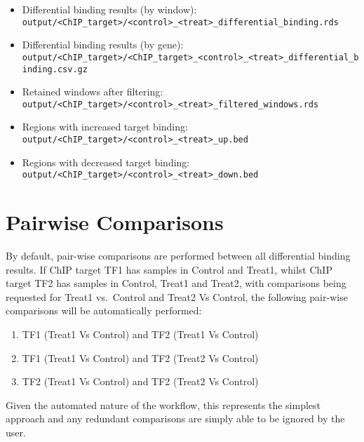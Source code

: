 \documentclass[
]{book}
\providecommand{\tightlist}{%
  \setlength{\itemsep}{0pt}\setlength{\parskip}{0pt}}
\begin{document}
\begin{itemize}
\tightlist
\item
  Differential binding results (by window): \texttt{output/\textless{}ChIP\_target\textgreater{}/\textless{}control\textgreater{}\_\textless{}treat\textgreater{}\_differential\_binding.rds}
\item
  Differential binding results (by gene): \texttt{output/\textless{}ChIP\_target\textgreater{}/\textless{}ChIP\_target\textgreater{}\_\textless{}control\textgreater{}\_\textless{}treat\textgreater{}\_differential\_binding.csv.gz}
\item
  Retained windows after filtering: \texttt{output/\textless{}ChIP\_target\textgreater{}/\textless{}control\textgreater{}\_\textless{}treat\textgreater{}\_filtered\_windows.rds}
\item
  Regions with increased target binding: \texttt{output/\textless{}ChIP\_target\textgreater{}/\textless{}control\textgreater{}\_\textless{}treat\textgreater{}\_up.bed}
\item
  Regions with decreased target binding: \texttt{output/\textless{}ChIP\_target\textgreater{}/\textless{}control\textgreater{}\_\textless{}treat\textgreater{}\_down.bed}
\end{itemize}

\hypertarget{pairwise-comparisons}{%
\section{Pairwise Comparisons}\label{pairwise-comparisons}}

By default, pair-wise comparisons are performed between all differential binding results.
If ChIP target TF1 has samples in Control and Treat1, whilst ChIP target TF2 has samples in Control, Treat1 and Treat2, with comparisons being requested for Treat1 vs.~Control and Treat2 Vs Control, the following pair-wise comparisons will be automatically performed:

\begin{enumerate}
\def\labelenumi{\arabic{enumi}.}
\tightlist
\item
  TF1 (Treat1 Vs Control) and TF2 (Treat1 Vs Control)
\item
  TF1 (Treat1 Vs Control) and TF2 (Treat2 Vs Control)
\item
  TF2 (Treat1 Vs Control) and TF2 (Treat2 Vs Control)
\end{enumerate}

Given the automated nature of the workflow, this represents the simplest approach and any redundant comparisons are simply able to be ignored by the user.
\end{document}
